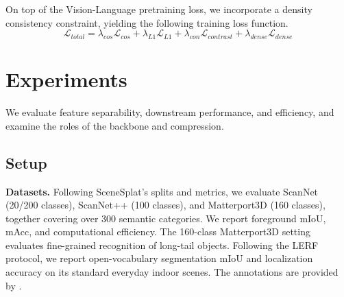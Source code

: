 \documentclass[10pt,twocolumn,letterpaper]{article}
\begin{document}
On top of the Vision-Language pretraining loss\cite{li2025scenesplat}, we incorporate a density consistency constraint, yielding the following training loss function.
\begin{equation}
    \mathcal{L}_{total} = \lambda_{cos}\mathcal{L}_{cos} + \lambda_{L1}\mathcal{L}_{L1} + \lambda_{con}\mathcal{L}_{contrast} + \lambda_{dense}\mathcal{L}_{dense}
    \label{eq:total-loss}
\end{equation}










\section{Experiments}
\label{sec:experiment}
We evaluate feature separability, downstream performance, and efficiency, and examine the roles of the backbone and compression.

% 


\subsection{Setup}
\noindent\textbf{Datasets.}
Following SceneSplat's splits and metrics, we evaluate ScanNet (20/200 classes), ScanNet++ (100 classes), and Matterport3D (160 classes), together covering over 300 semantic categories. We report foreground mIoU, mAcc, and computational efficiency. The 160-class Matterport3D setting evaluates fine-grained recognition of long-tail objects. 
Following the LERF\cite{lerf2023} protocol, we report open-vocabulary segmentation mIoU and localization accuracy on its standard everyday indoor scenes.
The annotations are provided by \cite{qin2024langsplat}.
\end{document}
